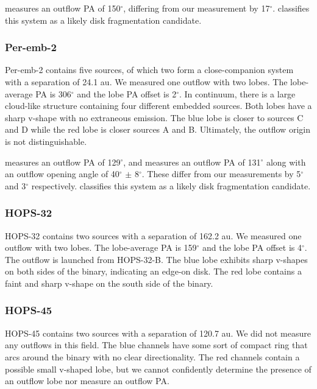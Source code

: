 \documentclass[linenumbers,twocolumn, twocolappendix]{aastex631}
\begin{document}
\cite{Lee_et_al_2016} measures an outflow PA of 150$^\circ$, differing from our measurement by 17$^\circ$. \cite{Reynolds_et_al_2024} classifies this system as a likely disk fragmentation candidate.

\subsubsection{Per-emb-2}
Per-emb-2 contains five sources, of which two form a close-companion system with a separation of 24.1 au. We measured one outflow with two lobes. The lobe-average PA is 306$^\circ$ and the lobe PA offset is 2$^\circ$. In continuum, there is a large cloud-like structure containing four different embedded sources. Both lobes have a sharp v-shape with no extraneous emission. The blue lobe is closer to sources C and D while the red lobe is closer sources A and B. Ultimately, the outflow origin is not distinguishable.

\cite{Stephens_et_al_2017} measures an outflow PA of 129$^\circ$, and \cite{Dunham_et_al_2024} measures an outflow PA of 131$^\circ$ along with an outflow opening angle of 40$^\circ$ $\pm$ 8$^\circ$. These differ from our measurements by 5$^\circ$ and 3$^\circ$ respectively. \cite{Reynolds_et_al_2024} classifies this system as a likely disk fragmentation candidate.

\subsubsection{HOPS-32}
HOPS-32 contains two sources with a separation of 162.2 au. We measured one outflow with two lobes. The lobe-average PA is 159$^\circ$ and the lobe PA offset is 4$^\circ$. The outflow is launched from HOPS-32-B. The blue lobe exhibits sharp v-shapes on both sides of the binary, indicating an edge-on disk. The red lobe contains a faint and sharp v-shape on the south side of the binary.

\subsubsection{HOPS-45}
HOPS-45 contains two sources with a separation of 120.7 au. We did not measure any outflows in this field. The blue channels have some sort of compact ring that arcs around the binary with no clear directionality. The red channels contain a possible small v-shaped lobe, but we cannot confidently determine the presence of an outflow lobe nor measure an outflow PA.
\end{document}

